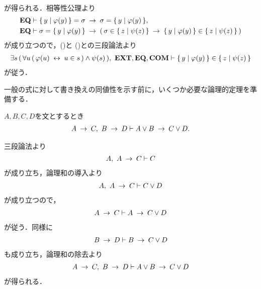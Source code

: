 \begin{sketch}
\begin{align}
			\label{fom:equivalent_formula_rewriting_12_4}
		\end{align}
		が得られる．相等性公理より
		\begin{align}
			\mbox{{\bf EQ}} &\vdash \{\, y \mid \varphi(y)\, \} = \sigma \hspace{0.25em}\rightarrow\hspace{0.25em} \sigma = \{\, y \mid \varphi(y)\, \}, \\
			\mbox{{\bf EQ}} &\vdash \sigma = \{\, y \mid \varphi(y)\, \} \hspace{0.25em}\rightarrow\hspace{0.25em}
			(\, \sigma \in \{\, z \mid \psi(z)\, \} \hspace{0.25em}\rightarrow\hspace{0.25em} \{\, y \mid \varphi(y)\, \} \in \{\, z \mid \psi(z)\, \}\, )
		\end{align}
		が成り立つので，()と
		()との三段論法より
		\begin{align}
			\exists s\, (\, \forall u\, (\, \varphi(u) \hspace{0.25em}\leftrightarrow\hspace{0.25em} u \in s\, ) \wedge \psi(s)\, ),\ \mbox{{\bf EXT}},\mbox{{\bf EQ}},\mbox{\bf COM} \vdash \{\, y \mid \varphi(y)\, \} \in \{\, z \mid \psi(z)\, \}
		\end{align}
		が従う．
		\QED
	\end{sketch}
	
	一般の式に対して書き換えの同値性を示す前に，いくつか必要な論理的定理を準備する．
	
	\begin{screen}
		\begin{logicalthm}[含意の論理和への遺伝性2]
		\label{logicalthm:heredity_of_implication_to_disjunction_2}
			$A,B,C,D$を文とするとき
			\begin{align}
				A \hspace{0.25em}\rightarrow\hspace{0.25em} C,\ B \hspace{0.25em}\rightarrow\hspace{0.25em} D \vdash A \vee B \hspace{0.25em}\rightarrow\hspace{0.25em} C \vee D.
			\end{align}
		\end{logicalthm}
	\end{screen}
	
	\begin{sketch}
		三段論法より
		\begin{align}
			A,\ A \hspace{0.25em}\rightarrow\hspace{0.25em} C \vdash C
		\end{align}
		が成り立ち，論理和の導入より
		\begin{align}
			A,\ A \hspace{0.25em}\rightarrow\hspace{0.25em} C \vdash C \vee D
		\end{align}
		が成り立つので，
		\begin{align}
			A \hspace{0.25em}\rightarrow\hspace{0.25em} C \vdash A \hspace{0.25em}\rightarrow\hspace{0.25em} C \vee D
		\end{align}
		が従う．同様に
		\begin{align}
			B \hspace{0.25em}\rightarrow\hspace{0.25em} D \vdash B \hspace{0.25em}\rightarrow\hspace{0.25em} C \vee D
		\end{align}
		も成り立ち，論理和の除去より
		\begin{align}
			A \hspace{0.25em}\rightarrow\hspace{0.25em} C,\ B \hspace{0.25em}\rightarrow\hspace{0.25em} D \vdash A \vee B \hspace{0.25em}\rightarrow\hspace{0.25em} C \vee D
		\end{align}
		が得られる．
		\QED
	\end{sketch}
	
